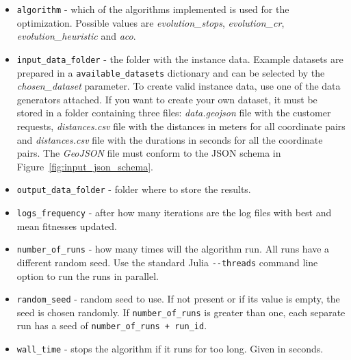 \begin{itemize}
    \setlength\itemsep{0pt}
    \item \texttt{algorithm} - which of the algorithms implemented is used for the optimization. Possible values are \textit{evolution\_stops}, \textit{evolution\_cr}, \textit{evolution\_heuristic} and \textit{aco}.
    \item \texttt{input\_data\_folder} - the folder with the instance data. Example datasets are prepared in a \texttt{available\_datasets} dictionary and can be selected by the \textit{chosen\_dataset} parameter. To create valid instance data, use one of the data generators attached. If you want to create your own dataset, it must be stored in a folder containing three files: \textit{data.geojson} file with the customer requests, \textit{distances.csv} file with the distances in meters for all coordinate pairs and \textit{distances.csv} file with the durations in seconds for all the coordinate pairs. The \textit{GeoJSON} file must conform to the JSON schema in Figure~\ref{fig:input_json_schema}.
    \item \texttt{output\_data\_folder} - folder where to store the results.
    \item \texttt{logs\_frequency} - after how many iterations are the log files with best and mean fitnesses updated.
    \item \texttt{number\_of\_runs} - how many times will the algorithm run. All runs have a different random seed. Use the standard Julia \texttt{-{}-threads} command line option to run the runs in parallel.
    \item \texttt{random\_seed} - random seed to use. If not present or if its value is empty, the seed is chosen randomly. If \texttt{number\_of\_runs} is greater than one, each separate run has a seed of \texttt{number\_of\_runs + run\_id}. 
    \item \texttt{wall\_time} - stops the algorithm if it runs for too long. Given in seconds. 
\end{itemize}

